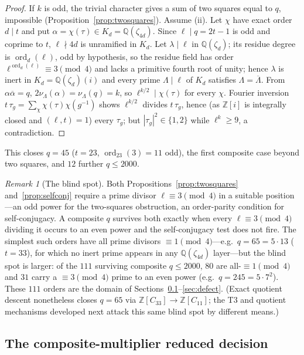 \documentclass[11pt]{article}
\theoremstyle{plain}
\theoremstyle{definition}
\theoremstyle{remark}
\newtheorem{remark}[theorem]{Remark}
\newcommand{\Z}{\mathbb Z}
\newcommand{\Q}{\mathbb Q}
\newcommand{\ord}{\operatorname{ord}}
\begin{document}
\begin{proof}
If $k$ is odd, the trivial character gives a sum of two squares equal to $q$,
impossible (Proposition~\ref{prop:twosquares}). Assume (ii). Let $\chi$ have
exact order $d\mid t$ and put $\alpha=\chi(\tau)\in K_d=\Q(\zeta_{4d})$. Since
$\ell\mid q=2t-1$ is odd and coprime to $t$, $\ell\nmid4d$ is unramified in
$K_d$. Let $\lambda\mid\ell$ in $\Q(\zeta_d)$; its residue degree is
$\ord_d(\ell)$, odd by hypothesis, so the residue field has order
$\ell^{\ord_d(\ell)}\equiv3\pmod4$ and lacks a primitive fourth root of unity;
hence $\lambda$ is inert in $K_d=\Q(\zeta_d)(i)$ and every prime
$\Lambda\mid\ell$ of $K_d$ satisfies $\Lambda=\overline\Lambda$. From
$\alpha\overline\alpha=q$, $2\nu_\Lambda(\alpha)=\nu_\Lambda(q)=k$, so
$\ell^{k/2}\mid\chi(\tau)$ for every $\chi$. Fourier inversion
$t\,\tau_g=\sum_\chi\chi(\tau)\chi(g^{-1})$ shows $\ell^{k/2}$ divides
$t\,\tau_g$, hence (as $\Z[i]$ is integrally closed and $(\ell,t)=1$) every
$\tau_g$; but $|\tau_g|^2\in\{1,2\}$ while $\ell^k\ge9$, a contradiction.
\end{proof}

This closes $q=45$ ($t=23$, $\ord_{23}(3)=11$ odd), the first composite case
beyond two squares, and $12$ further $q\le2000$.

\begin{remark}[The blind spot]\label{rem:blindspot}
Both Propositions~\ref{prop:twosquares} and~\ref{prop:selfconj} require a prime
divisor $\ell\equiv3\pmod4$ in a suitable position---an odd power for the
two-squares obstruction, an order-parity condition for self-conjugacy. A
composite $q$ survives both exactly when every $\ell\equiv3\pmod4$ dividing it
occurs to an even power and the self-conjugacy test does not fire. The simplest
such orders have all prime divisors $\equiv1\pmod4$---e.g.\ $q=65=5\cdot13$
($t=33$), for which no inert prime appears in any $\Q(\zeta_{4d})$ layer---but
the blind spot is larger: of the $111$ surviving composite $q\le2000$, $80$ are
all-$\equiv1\pmod4$ and $31$ carry a $\equiv3\pmod4$ prime to an even power
(e.g.\ $q=245=5\cdot7^2$). These $111$ orders are the domain of
Sections~\ref{sec:t3-decision}--\ref{sec:defect}. (Exact quotient descent
nonetheless closes $q=65$ via $\Z[C_{33}]\to\Z[C_{11}]$; the T3 and quotient
mechanisms developed next attack this same blind spot by different means.)
\end{remark}

\subsection{The composite-multiplier reduced decision}\label{sec:t3-decision}
\end{document}
